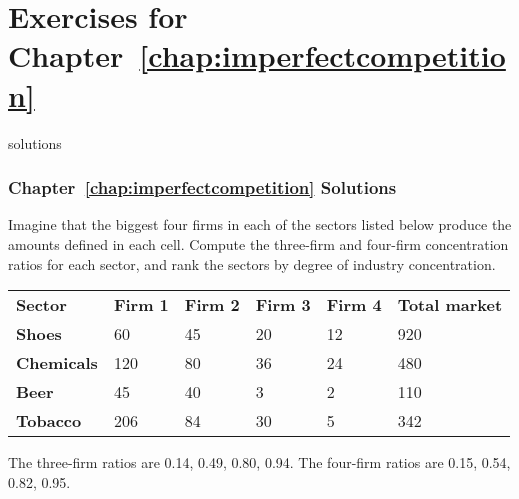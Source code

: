 \newpage
\section*{Exercises for Chapter~\ref{chap:imperfectcompetition}}

\begin{Filesave}{solutions}
\subsubsection*{Chapter~\ref{chap:imperfectcompetition} Solutions}
\end{Filesave}

\begin{enumialphparenastyle}

\begin{econex}\label{ex:ch11ex1}
Imagine that the biggest four firms in each of the sectors listed below produce the amounts defined in each cell. Compute the three-firm and four-firm concentration ratios for each sector, and rank the sectors by degree of industry concentration.
\begin{Table}{}
\begin{tabu} to \linewidth {|X[1,c]X[1,c]X[1,c]X[1,c]X[1,c]X[1,c]|}	\hline
{}	\textbf{Sector}	&	\textbf{Firm 1}	&	\textbf{Firm 2}	&	\textbf{Firm 3}	&	\textbf{Firm 4}	&	\textbf{Total market}	\\
\textbf{Shoes}		&	60	&	45	&	20	&	12	&	920	\\
	\textbf{Chemicals}	&	120	&	80	&	36	&	24	&	480	\\
\textbf{Beer}		&	45	&	40	&	3	&	2	&	110	\\
	\textbf{Tobacco}	&	206	&	84	&	30	&	5	&	342	\\	\hline
\end{tabu}
\end{Table}
\begin{econsolution}
The three-firm ratios are 0.14, 0.49, 0.80, 0.94. The four-firm ratios are 0.15, 0.54, 0.82, 0.95.

\end{econsolution}
\end{econex}


\end{enumialphparenastyle}
